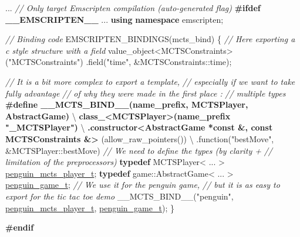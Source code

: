 \documentclass[a4paper,11pt]{article}
\newenvironment{Shaded}{}{}
\newcommand{\KeywordTok}[1]{\textbf{#1}}
\newcommand{\DataTypeTok}[1]{\underline{#1}}
\newcommand{\StringTok}[1]{#1}
\newcommand{\CommentTok}[1]{\textit{#1}}
\newcommand{\PreprocessorTok}[1]{\textbf{#1}}
\newcommand{\NormalTok}[1]{#1}
\begin{document}
\begin{Shaded}
\begin{Highlighting}[numbers=left,,firstnumber=0,]
\NormalTok{...}
    \CommentTok{// Only target Emscripten compilation (auto-generated flag)}
\PreprocessorTok{#ifdef __EMSCRIPTEN__}
\NormalTok{...}
\KeywordTok{using} \KeywordTok{namespace}\NormalTok{ emscripten;}

\CommentTok{// Binding code}
\NormalTok{EMSCRIPTEN_BINDINGS(mcts_bind)}
\NormalTok{\{}
    \CommentTok{// Here exporting a c style structure with a field}
\NormalTok{    value_object<MCTSConstraints>(}\StringTok{"MCTSConstraints"}\NormalTok{)}
\NormalTok{        .field(}\StringTok{"time"}\NormalTok{, &MCTSConstraints::time);}

    \CommentTok{// It is a bit more complex to export a template,}
    \CommentTok{// especially if we want to take fully advantage }
    \CommentTok{// of why they were made in the first place :}
    \CommentTok{// multiple types}
\PreprocessorTok{#define __MCTS_BIND__(name_prefix, MCTSPlayer, AbstractGame)                               }\NormalTok{\textbackslash{}}
\PreprocessorTok{    class_<MCTSPlayer>(name_prefix "_MCTSPlayer")                                          }\NormalTok{\textbackslash{}}
\PreprocessorTok{        .constructor<AbstractGame *const &, const MCTSConstraints &>}
\NormalTok{                                            (allow_raw_pointers()) \textbackslash{}}
\NormalTok{        .function(}\StringTok{"bestMove"}\NormalTok{, &MCTSPlayer::bestMove) }
    \CommentTok{// We need to define the types (by clarity + }
    \CommentTok{//                  limitation of the preprocessors)}
    \KeywordTok{typedef}\NormalTok{ MCTSPlayer< ... > }\DataTypeTok{penguin_mcts_player_t}\NormalTok{;}
    \KeywordTok{typedef}\NormalTok{ game::AbstractGame< ... > }\DataTypeTok{penguin_game_t}\NormalTok{;}
    \CommentTok{// We use it for the penguin game,}
    \CommentTok{// but it is as easy to export for the tic tac toe demo}
\NormalTok{    __MCTS_BIND__(}\StringTok{"penguin"}\NormalTok{, }\DataTypeTok{penguin_mcts_player_t}\NormalTok{, }\DataTypeTok{penguin_game_t}\NormalTok{);}
\NormalTok{\}}

\PreprocessorTok{#endif}
\end{Highlighting}
\end{Shaded}
\end{document}

